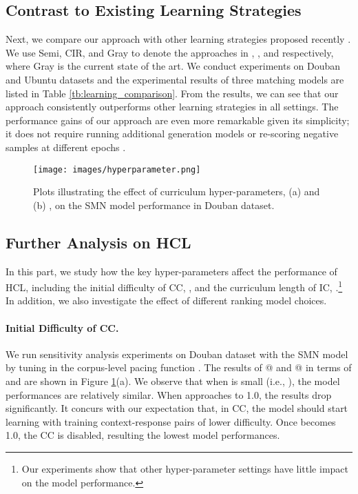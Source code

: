 \documentclass[11pt,a4paper]{article}
\begin{document}
\subsection{Contrast to Existing Learning Strategies}
Next, we compare our approach with other learning strategies proposed recently \cite{li-etal-2019-sampling,DBLP:conf/ecir/PenhaH20,lin2020world}. We use Semi, CIR, and Gray to denote the approaches in \citet{li-etal-2019-sampling}, \citet{DBLP:conf/ecir/PenhaH20}, and \citet{lin2020world} respectively, where Gray is the current state of the art. We conduct experiments on Douban and Ubuntu datasets and the experimental results of three matching models are listed in Table \ref{tb:learning_comparison}. 
From the results, we can see that our approach consistently outperforms other learning strategies in all settings. The performance gains of our approach are even more remarkable given its simplicity; it does not require running additional generation models \cite{lin2020world} or re-scoring negative samples at different epochs \cite{li-etal-2019-sampling}.

\begin{figure}[!t] 
	\centering    
	\setlength{\abovecaptionskip}{3pt}
\texttt{[image: images/hyperparameter.png]}
	\caption{Plots illustrating the effect of curriculum hyper-parameters, (a)  and (b) , on the SMN model performance in Douban dataset.}
\label{fig:hyperparameter_curve}
\end{figure}
\subsection{Further Analysis on HCL}
In this part, we study how the key hyper-parameters affect the performance of HCL, including the initial difficulty of CC, , and the curriculum length of IC, .\footnote{Our experiments show that other hyper-parameter settings have little impact on the model performance.} In addition, we also investigate the effect of different ranking model choices.
\paragraph{Initial Difficulty of CC.} 
We run sensitivity analysis experiments on Douban dataset with the SMN model by tuning  in the corpus-level pacing function . The results of @ and @ in terms of  and  are shown in Figure \ref{fig:hyperparameter_curve}(a). We observe that when  is small (i.e., ), the model performances are relatively similar. When  approaches to 1.0, the results drop significantly. It concurs with our expectation that, in CC, the model should start learning with training context-response pairs of lower difficulty. Once  becomes 1.0, the CC is disabled, resulting the lowest model performances.
\end{document}
